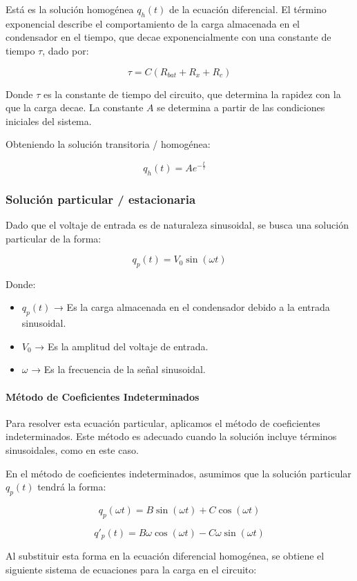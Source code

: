 Está es la solución homogénea \(q_h(t)\) de la ecuación diferencial. El término exponencial
describe el comportamiento de la carga almacenada en el condensador en
el tiempo, que decae exponencialmente con una constante de tiempo \(\tau\), dado por:

\[
	\tau = C(R_{bat} + R_x + R_c)
\]

Donde \(\tau\) es la constante de tiempo del circuito, que determina la rapidez con la que la
carga decae. La constante \(A\) se determina a partir de las condiciones iniciales del
sistema.

Obteniendo la solución transitoria / homogénea:

\[
	q_h(t) = A e^{-\frac{t}{\tau}} \quad
\]

\subsubsection*{Solución particular / estacionaria}
Dado que el voltaje de entrada es de naturaleza sinusoidal, se busca una solución particular de
la forma:

\[
	q_p(t) = V_0\sin(\omega t)
\]

Donde:
\begin{itemize}
	\item \(q_p(t)\) → Es la carga almacenada en el condensador debido a la entrada sinusoidal.
	\item \(V_0\) → Es la amplitud del voltaje de entrada.
	\item \(\omega\) → Es la frecuencia de la señal sinusoidal.
\end{itemize}

\paragraph*{Método de Coeficientes Indeterminados}
Para resolver esta ecuación particular, aplicamos el método de coeficientes indeterminados.
Este método es adecuado cuando la solución incluye términos sinusoidales, como en este
caso.

En el método de coeficientes indeterminados, asumimos que la solución particular \( q_p(t) \)
tendrá la forma:

\[
	q_p(\omega t) = B \sin(\omega t) + C \cos(\omega t)
\]

\[
	q'_p(t) = B\omega \cos(\omega t) - C\omega \sin(\omega t)
\]

Al substituir esta forma en la ecuación diferencial homogénea, se obtiene el siguiente sistema
de ecuaciones para la carga en el circuito:

